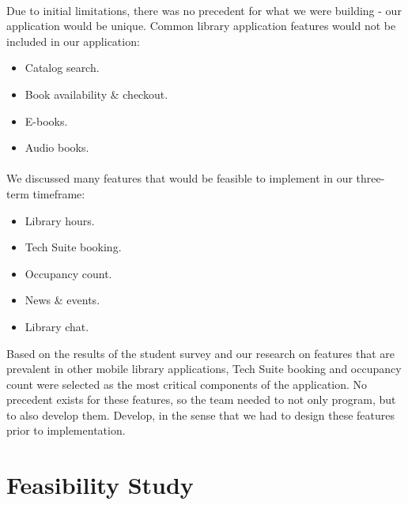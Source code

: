         \paragraph{}
         Due to initial limitations, there was no precedent for what we were building - our application would be unique. Common library application features would not be included in our application:
        \begin{itemize}
            \item Catalog search.
            \item Book availability \& checkout.
            \item E-books.
            \item Audio books.
        \end{itemize}
        \paragraph{}
         We discussed many features that would be feasible to implement in our three-term timeframe:
        \begin{itemize}
            \item Library hours.
            \item Tech Suite booking.
            \item Occupancy count.
            \item News \& events.
            \item Library chat.
        \end{itemize}
        Based on the results of the student survey and our research on features that are prevalent in other mobile library applications, Tech Suite booking and occupancy count were selected as the most critical components of the application. No precedent exists for these features, so the team needed to not only program, but to also develop them. Develop, in the sense that we had to design these features prior to implementation.
    \newpage
    
    
    \section{Feasibility Study}
